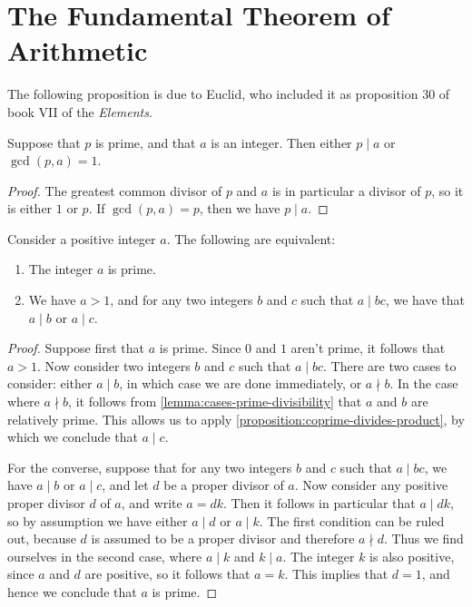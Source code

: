 \section{The Fundamental Theorem of Arithmetic}

The following proposition is due to Euclid, who included it as proposition 30 of book VII of the \emph{Elements}.

\begin{lemma}\label{lemma:cases-prime-divisibility}
  Suppose that $p$ is prime, and that $a$ is an integer. Then either $p\mid a$ or $\gcd(p,a)=1$.
\end{lemma}

\begin{proof}
  The greatest common divisor of $p$ and $a$ is in particular a divisor of $p$, so it is either $1$ or $p$. If $\gcd(p,a)=p$, then we have $p\mid a$.
\end{proof}

\begin{proposition}\label{proposition:euclid-divisibility-primes}
  Consider a positive integer $a$. The following are equivalent:
  \begin{enumerate}
  \item The integer $a$ is prime.
  \item We have $a>1$, and for any two integers $b$ and $c$ such that $a\mid bc$, we have that $a\mid b$ or $a\mid c$.
  \end{enumerate}
\end{proposition}

\begin{proof}
  Suppose first that $a$ is prime. Since $0$ and $1$ aren't prime, it follows that $a>1$. Now consider two integers $b$ and $c$ such that $a\mid bc$. There are two cases to consider: either $a\mid b$, in which case we are done immediately, or $a\nmid b$. In the case where $a\nmid b$, it follows from \cref{lemma:cases-prime-divisibility} that $a$ and $b$ are relatively prime. This allows us to apply \cref{proposition:coprime-divides-product}, by which we conclude that $a\mid c$.

  For the converse, suppose that for any two integers $b$ and $c$ such that $a\mid bc$, we have $a\mid b$ or $a\mid c$, and let $d$ be a proper divisor of $a$. Now consider any positive proper divisor $d$ of $a$, and write $a=dk$. Then it follows in particular that $a \mid dk$, so by assumption we have either $a\mid d$ or $a\mid k$. The first condition can be ruled out, because $d$ is assumed to be a proper divisor and therefore $a \nmid d$. Thus we find ourselves in the second case, where $a\mid k$ and $k\mid a$. The integer $k$ is also positive, since $a$ and $d$ are positive, so it follows that $a=k$. This implies that $d=1$, and hence we conclude that $a$ is prime.
\end{proof}

